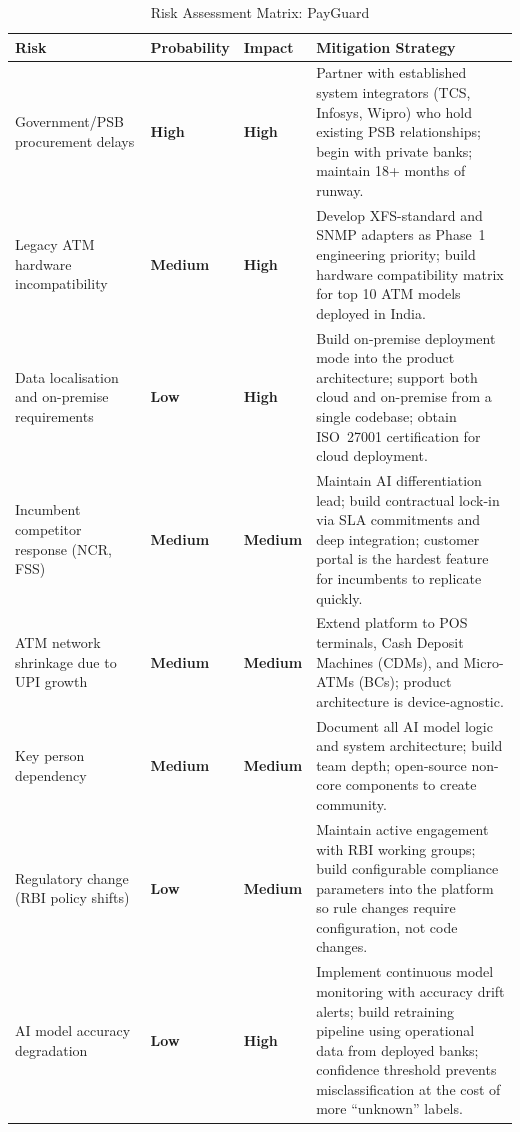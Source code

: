 \documentclass[12pt,a4paper]{article}
\begin{document}
\begin{table}[H]
\centering
\caption{Risk Assessment Matrix: PayGuard}
\small
\begin{tabular}{@{}L{4.0cm} C{2.0cm} C{2.0cm} L{5.5cm}@{}}
\toprule
\textbf{Risk} & \textbf{Probability} & \textbf{Impact} & \textbf{Mitigation Strategy} \\
\midrule
Government/PSB procurement delays &
  \textbf{High} & \textbf{High} &
  Partner with established system integrators (TCS, Infosys, Wipro) who hold existing PSB
  relationships; begin with private banks; maintain 18+ months of runway. \\
\addlinespace
Legacy ATM hardware incompatibility &
  \textbf{Medium} & \textbf{High} &
  Develop XFS-standard and SNMP adapters as Phase~1 engineering priority;
  build hardware compatibility matrix for top 10 ATM models deployed in India. \\
\addlinespace
Data localisation and on-premise requirements &
  \textbf{Low} & \textbf{High} &
  Build on-premise deployment mode into the product architecture;
  support both cloud and on-premise from a single codebase;
  obtain ISO~27001 certification for cloud deployment. \\
\addlinespace
Incumbent competitor response (NCR, FSS) &
  \textbf{Medium} & \textbf{Medium} &
  Maintain AI differentiation lead; build contractual lock-in via SLA commitments
  and deep integration; customer portal is the hardest feature for incumbents to replicate
  quickly. \\
\addlinespace
ATM network shrinkage due to UPI growth &
  \textbf{Medium} & \textbf{Medium} &
  Extend platform to POS terminals, Cash Deposit Machines (CDMs), and Micro-ATMs
  (BCs); product architecture is device-agnostic. \\
\addlinespace
Key person dependency &
  \textbf{Medium} & \textbf{Medium} &
  Document all AI model logic and system architecture; build team depth;
  open-source non-core components to create community. \\
\addlinespace
Regulatory change (RBI policy shifts) &
  \textbf{Low} & \textbf{Medium} &
  Maintain active engagement with RBI working groups; build configurable compliance
  parameters into the platform so rule changes require configuration, not code changes. \\
\addlinespace
AI model accuracy degradation &
  \textbf{Low} & \textbf{High} &
  Implement continuous model monitoring with accuracy drift alerts;
  build retraining pipeline using operational data from deployed banks;
  confidence threshold prevents misclassification at the cost of more ``unknown'' labels. \\
\bottomrule
\end{tabular}
\end{table}
\end{document}
